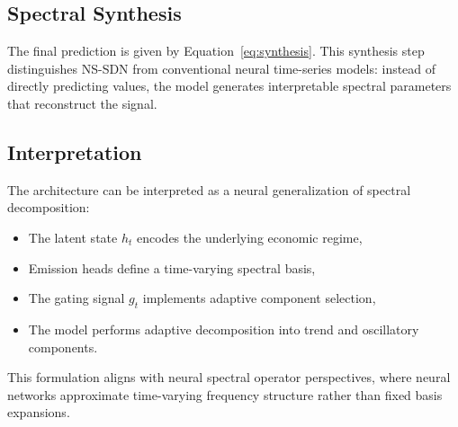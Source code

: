 \subsection{Spectral Synthesis}
The final prediction is given by Equation~\eqref{eq:synthesis}. This synthesis step distinguishes NS-SDN from conventional neural time-series models: instead of directly predicting values, the model generates interpretable spectral parameters that reconstruct the signal.

\subsection{Interpretation}
The architecture can be interpreted as a neural generalization of spectral decomposition:
\begin{itemize}
\item The latent state $h_t$ encodes the underlying economic regime,
\item Emission heads define a time-varying spectral basis,
\item The gating signal $g_t$ implements adaptive component selection,
\item The model performs adaptive decomposition into trend and oscillatory components.
\end{itemize}
This formulation aligns with neural spectral operator perspectives, where neural networks approximate time-varying frequency structure rather than fixed basis expansions.
